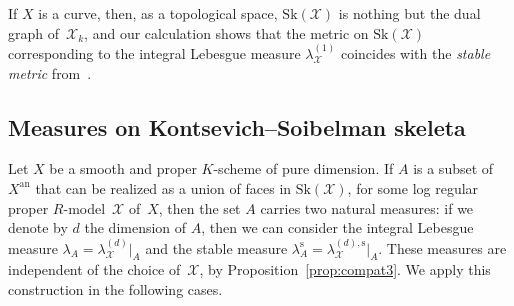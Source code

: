 \documentclass[JEP,XML,SOM,Unicode,NoFloatCountersInSection]{cedram}
\theoremstyle{definition}
\numberwithin{equation}{subsection}
\newcommand{\cX}{\ensuremath{\mathscr{X}}}
\newcommand{\snc}{\textit{snc}}
\newcommand{\an}{\mathrm{an}}
\newcommand{\Sk}{\mathrm{Sk}}
\newcommand{\rs}{\mathrm{s}}
\newcommand{\tdeg}{\mathrm{tdeg}}
\let\Leb\lambda
\begin{document}
If $X$ is a curve, then, as a topological space, $\Sk(\cX)$ is nothing but the dual graph of~$\cX_k$, and our calculation shows that the metric on $\Sk(\cX)$ corresponding to the integral Lebesgue measure $\Leb^{(1)}_{\cX}$ coincides with the {\em stable metric} from~\cite[A.1]{BaNi}.

\subsection{Measures on Kontsevich--Soibelman skeleta}
Let $X$ be a smooth and proper $K$\nobreakdash-scheme of pure dimension.
If $A$ is a subset of $X^{\an}$ that can be realized as a union of faces in $\Sk(\cX)$, for some log regular proper $R$\nobreakdash-model~$\cX$ of~$X$, then the set $A$ carries two natural measures: if we denote by $d$ the dimension of $A$, then we can consider the integral Lebesgue measure $\Leb_A=\Leb^{(d)}_{\cX}|_A$ and the stable measure $\Leb^{\rs}_A=\Leb^{(d),\rs}_{\cX}|_A$. These measures are independent of the choice of~$\cX$, by Proposition~\ref{prop:compat3}. We apply this construction in the following cases.
\end{document}
